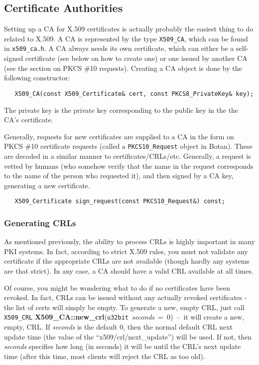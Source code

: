\documentclass{article}
\newcommand{\filename}[1]{\texttt{#1}}
\newcommand{\function}[1]{\textbf{#1}}
\newcommand{\type}[1]{\texttt{#1}}
\renewcommand{\arg}[1]{\textsl{#1}}
\begin{document}
\subsection{Certificate Authorities}

Setting up a CA for X.509 certificates is actually probably the easiest thing
to do related to X.509. A CA is represented by the type \type{X509\_CA}, which
can be found in \filename{x509\_ca.h}. A CA always needs its own certificate,
which can either be a self-signed certificate (see below on how to create one)
or one issued by another CA (see the section on PKCS \#10 requests). Creating
a CA object is done by the following constructor:

\begin{verbatim}
   X509_CA(const X509_Certificate& cert, const PKCS8_PrivateKey& key);
\end{verbatim}

The private key is the private key corresponding to the public key in the the
CA's certificate.

Generally, requests for new certificates are supplied to a CA in the form on
PKCS \#10 certificate requests (called a \type{PKCS10\_Request} object in
Botan). These are decoded in a similar manner to
certificates/CRLs/etc. Generally, a request is vetted by humans (who somehow
verify that the name in the request corresponds to the name of the person who
requested it), and then signed by a CA key, generating a new certificate.

\begin{verbatim}
   X509_Certificate sign_request(const PKCS10_Request&) const;
\end{verbatim}

\subsubsection{Generating CRLs}

As mentioned previously, the ability to process CRLs is highly important in
many PKI systems. In fact, according to strict X.509 rules, you must not
validate any certificate if the appropriate CRLs are not available (though
hardly any systems are that strict). In any case, a CA should have a valid CRL
available at all times.

Of course, you might be wondering what to do if no certificates have been
revoked. In fact, CRLs can be issued without any actually revoked certificates
- the list of certs will simply be empty. To generate a new, empty CRL, just
call \type{X509\_CRL}
\function{X509\_CA::new\_crl}(\type{u32bit}~\arg{seconds}~=~0)~--~it will
create a new, empty, CRL. If \arg{seconds} is the default 0, then the normal
default CRL next update time (the value of the ``x509/crl/next\_update'') will
be used. If not, then \arg{seconds} specifies how long (in seconds) it will be
until the CRL's next update time (after this time, most clients will reject the
CRL as too old).
\end{document}
